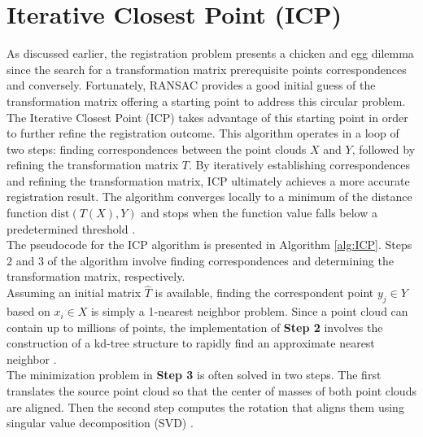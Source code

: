 \section{Iterative Closest Point (ICP)}

As discussed earlier, the registration problem presents a chicken and egg dilemma since the search for a transformation matrix prerequisite points correspondences and conversely. Fortunately, RANSAC provides a good initial guess of the transformation matrix offering a starting point to address this circular problem.\\

The Iterative Closest Point (ICP) takes advantage of this starting point in order to further refine the registration outcome. This algorithm operates in a loop of two steps: finding correspondences between the point clouds $X$ and $Y$, followed by refining the transformation matrix $T$. By iteratively establishing correspondences and refining the transformation matrix, ICP ultimately achieves a more accurate registration result. The algorithm converges locally to a minimum of the distance function $\text{dist}(T(X), Y)$ and stops when the function value falls below a predetermined threshold \cite{ICP}.\\

The pseudocode for the ICP algorithm is presented in Algorithm \ref{alg:ICP}. Steps 2 and 3 of the algorithm involve finding correspondences and determining the transformation matrix, respectively.\\

Assuming an initial matrix $\hat{T}$ is available, finding the correspondent point $y_j \in Y$ based on $x_i \in X$ is simply a 1-nearest neighbor problem. Since a point cloud can contain up to millions of points, the implementation of \textbf{Step 2} involves the construction of a kd-tree structure to rapidly find an approximate nearest neighbor \cite{kdtree}.\\

The minimization problem in \textbf{Step 3} is often solved in two steps. The first translates the source point cloud so that the center of masses of both point clouds are aligned. Then the second step computes the rotation that aligns them using singular value decomposition (SVD) \cite{ICP}.


